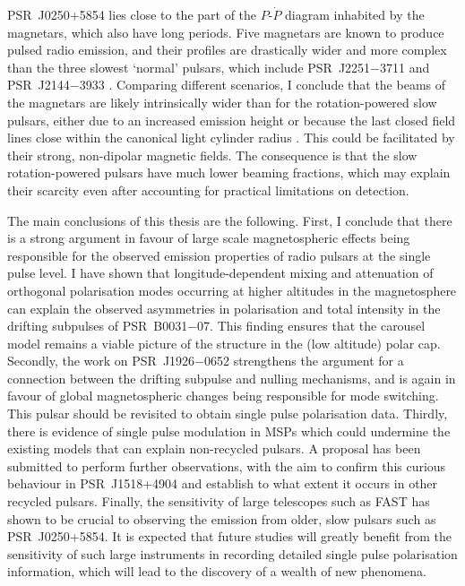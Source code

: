 PSR~J0250+5854 lies close to the part of the $P$-$\dot{P}$ diagram inhabited by the magnetars, which also have long periods. Five magnetars are known to produce pulsed radio emission, and their profiles are drastically wider and more complex than the three slowest `normal' pulsars, which include PSR~J2251$-$3711 \citep[$P_1 = 12.1$~s][]{MKE+2020} and PSR~J2144$-$3933 \citep[$P_1 = 8.5$~s][]{YMJx1999}. Comparing different scenarios, I conclude that the beams of the magnetars are likely intrinsically wider than for the rotation-powered slow pulsars, either due to an increased emission height or because the last closed field lines close within the canonical light cylinder radius \citep{Sxxx2006, Cxxx2014}. This could be facilitated by their strong, non-dipolar magnetic fields.  The consequence is that the slow rotation-powered pulsars have much lower beaming fractions, which may explain their scarcity even after accounting for practical limitations on detection.

















The main conclusions of this thesis are the following. First, I conclude that there is a strong argument in favour of large scale magnetospheric effects being responsible for the observed emission properties of radio pulsars at the single pulse level. I have shown that longitude-dependent mixing and attenuation of orthogonal polarisation modes occurring at higher altitudes in the magnetosphere can explain the observed asymmetries in polarisation and total intensity in the drifting subpulses of PSR~B0031$-$07. This finding ensures that the carousel model remains a viable picture of the structure in the (low altitude) polar cap. Secondly, the work on PSR~J1926$-$0652 strengthens the argument for a connection between the drifting subpulse and nulling mechanisms, and is again in favour of global magnetospheric changes being responsible for mode switching. This pulsar should be revisited to obtain single pulse polarisation data. Thirdly, there is evidence of single pulse modulation in MSPs which could undermine the existing models that can explain non-recycled pulsars. A proposal has been submitted to perform further observations, with the aim to confirm this curious behaviour in PSR~J1518+4904 and establish to what extent it occurs in other recycled pulsars. Finally, the sensitivity of large telescopes such as FAST has shown to be crucial to observing the emission from older, slow pulsars such as PSR~J0250+5854. It is expected that future studies will greatly benefit from the sensitivity of such large instruments in recording detailed single pulse polarisation information, which will lead to the discovery of a wealth of new phenomena.